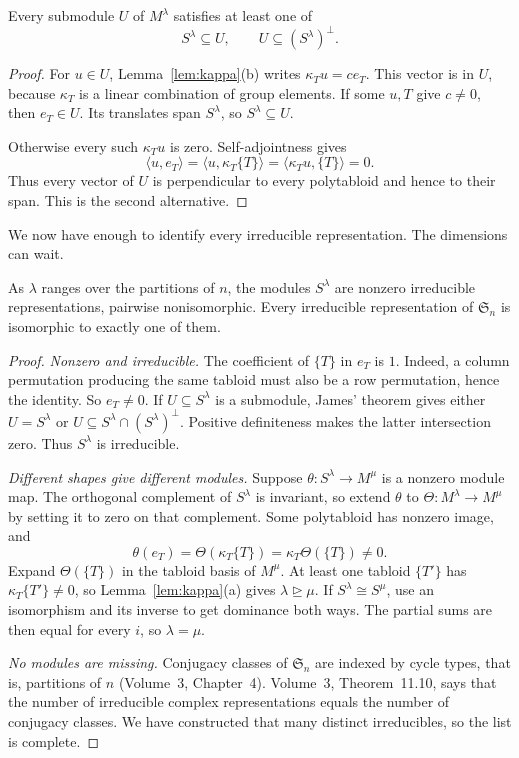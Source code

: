 \begin{theorem}\label{thm:james}
Every submodule $U$ of $M^\lambda$ satisfies at least one of
\[
S^\lambda\subseteq U,
\qquad U\subseteq(S^\lambda)^\perp.
\]
\end{theorem}

\begin{proof}
For $u\in U$, Lemma~\ref{lem:kappa}(b) writes $\kappa_Tu=c e_T$. This vector is in $U$, because $\kappa_T$ is a linear combination of group elements. If some $u,T$ give $c\ne0$, then $e_T\in U$. Its translates span $S^\lambda$, so $S^\lambda\subseteq U$.

Otherwise every such $\kappa_Tu$ is zero. Self-adjointness gives
\[
\langle u,e_T\rangle
=\langle u,\kappa_T\{T\}\rangle
=\langle\kappa_Tu,\{T\}\rangle=0.
\]
Thus every vector of $U$ is perpendicular to every polytabloid and hence to their span. This is the second alternative.
\end{proof}

We now have enough to identify every irreducible representation. The dimensions can wait.

\begin{theorem}\label{thm:specht}
As $\lambda$ ranges over the partitions of $n$, the modules $S^\lambda$ are nonzero irreducible representations, pairwise nonisomorphic. Every irreducible representation of $\mathfrak S_n$ is isomorphic to exactly one of them.
\end{theorem}

\begin{proof}
\emph{Nonzero and irreducible.}
The coefficient of $\{T\}$ in $e_T$ is $1$. Indeed, a column permutation producing the same tabloid must also be a row permutation, hence the identity. So $e_T\ne0$. If $U\subseteq S^\lambda$ is a submodule, James' theorem gives either $U=S^\lambda$ or
$U\subseteq S^\lambda\cap(S^\lambda)^\perp$.
Positive definiteness makes the latter intersection zero. Thus $S^\lambda$ is irreducible.

\emph{Different shapes give different modules.}
Suppose $\theta:S^\lambda\to M^\mu$ is a nonzero module map. The orthogonal complement of $S^\lambda$ is invariant, so extend $\theta$ to $\Theta:M^\lambda\to M^\mu$ by setting it to zero on that complement. Some polytabloid has nonzero image, and
\[
\theta(e_T)=\Theta(\kappa_T\{T\})
=\kappa_T\Theta(\{T\})\ne0.
\]
Expand $\Theta(\{T\})$ in the tabloid basis of $M^\mu$. At least one tabloid $\{T'\}$ has $\kappa_T\{T'\}\ne0$, so Lemma~\ref{lem:kappa}(a) gives $\lambda\trianglerighteq\mu$. If $S^\lambda\cong S^\mu$, use an isomorphism and its inverse to get dominance both ways. The partial sums are then equal for every $i$, so $\lambda=\mu$.

\emph{No modules are missing.}
Conjugacy classes of $\mathfrak S_n$ are indexed by cycle types, that is, partitions of $n$ (Volume~3, Chapter~4). Volume~3, Theorem~11.10, says that the number of irreducible complex representations equals the number of conjugacy classes. We have constructed that many distinct irreducibles, so the list is complete.
\end{proof}


